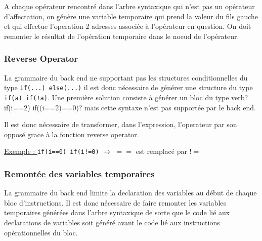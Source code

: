 A chaque opérateur rencontré dans l'arbre syntaxique qui n'est pas un opérateur d'affectation, on génère une variable temporaire qui prend la valeur du fils gauche et qui effectue l'operation 2 adresses associée à l'opérateur en question. On doit remonter le résultat de l'opération temporaire dans le noeud de l'opérateur.

\begin{center}
\end{center}

\subsubsection{Reverse Operator}

La grammaire du back end ne supportant pas les structures conditionnelles du type \verb?if(...) else(...)? il est donc nécessaire de générer une structure du type \verb?if(a) if(!a)?. Une première solution consiste à générer un bloc du type verb?if(i==2) if((i==2)==0)? mais cette syntaxe n'est pas supportée par le back end.

Il est donc nécessaire de transformer, dans l'expression, l'operateur par son opposé grace à la fonction reverse operator.

\underline{Exemple : } \verb?if(i==0) if(i!=0)? $\longrightarrow$ $==$ est remplacé par $!=$

\subsubsection{Remontée des variables temporaires}

La grammaire du back end limite la declaration des variables au début de chaque bloc d'instructions. Il est donc nécessaire de faire remonter les variables temporaires générées dans l'arbre syntaxique de sorte que le code lié aux declarations de variables soit généré avant le code lié aux instructions opérationnelles du bloc.

